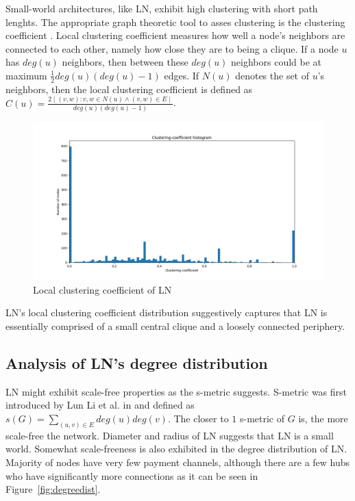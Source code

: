 \documentclass[a4paper]{article}
\theoremstyle{definition}
\begin{document}
Small-world architectures, like LN, exhibit high clustering with short path lenghts. The appropriate graph theoretic tool to asses clustering is the clustering coefficient \cite{watts1998collective}. Local clustering coefficient measures how well a node's neighbors are connected to each other, namely how close they are to being a clique. If a node $u$ has $deg(u)$ neighbors, then between these $deg(u)$ neighbors could be at maximum $\frac{1}{2}deg(u)(deg(u)-1)$ edges. If $N(u)$ denotes the set of $u$'s neighbors, then the local clustering coefficient is defined as $C(u)=\frac{2\mid (v,w): v,w \in N(u) \land (v,w) \in E \mid}{deg(u)(deg(u)-1)}$. 

\begin{figure}[h]
	\centering
	\includegraphics[width=\textwidth]{clusteringCoefficient.png}
	\caption{Local clustering coefficient of LN}\label{fig:localclustering}
\end{figure} 

 LN's local clustering coefficient distribution suggestively captures that LN is essentially comprised of a small central clique and a loosely connected periphery.
 
\subsection{Analysis of LN's degree distribution}

LN might exhibit scale-free properties as the s-metric suggests. S-metric was first introduced by Lun Li et al. in \cite{li2005towards} and defined as $s(G)=\sum_{(u,v)\in E}deg(u)deg(v)$. The closer to $1$  s-metric of $G$ is, the more scale-free the network. Diameter and radius of LN suggests that LN is a small world. Somewhat scale-freeness is also exhibited in the degree distribution of LN. Majority of nodes have very few payment channels, although there are a few hubs who have significantly more connections as it can be seen in Figure~\ref{fig:degreedist}.
\end{document}
